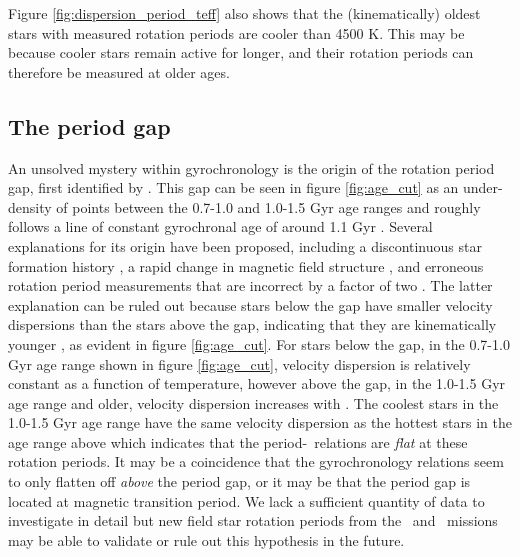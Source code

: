 Figure \ref{fig:dispersion_period_teff} also shows that the (kinematically)
oldest stars with measured rotation periods are cooler than 4500 K.
This may be because cooler stars remain active for longer, and their rotation
periods can therefore be measured at older ages.


\subsection{The period gap}
An unsolved mystery within gyrochronology is the origin of the rotation period
gap, first identified by \citet{mcquillan2013}.
This gap can be seen in figure \ref{fig:age_cut} as an under-density of points
between the 0.7-1.0 and 1.0-1.5 Gyr age ranges and roughly follows a line of
constant gyrochronal age of around 1.1 Gyr \citep[according to
the gyrochronology relation of][]{angus2019}.
Several explanations for its origin have been proposed, including a
discontinuous star formation history \citep{mcquillan2013, davenport2017,
davenport2018}, a rapid change in magnetic field structure
\citep{reinhold2019}, and erroneous rotation period measurements that are
incorrect by a factor of two \citep{koen2018}.
The latter explanation can be ruled out because stars below the gap have
smaller velocity dispersions than the stars above the gap, indicating that
they are kinematically younger \citep{mcquillan2013, davenport2018}, as
evident in figure \ref{fig:age_cut}.
For stars below the gap, in the 0.7-1.0 Gyr age range shown in figure
\ref{fig:age_cut}, velocity dispersion is relatively constant as a function of
temperature, however above the gap, in the 1.0-1.5 Gyr age range and older,
velocity dispersion increases with \teff.
The coolest stars in the 1.0-1.5 Gyr age range have the same velocity
dispersion as the hottest stars in the age range above which indicates that
the period-\teff\ relations are {\it flat} at these rotation periods.
It may be a coincidence that the gyrochronology relations seem to only flatten
off {\it above} the period gap, or it may be that the period gap is located at
magnetic transition period.
We lack a sufficient quantity of data to investigate in detail but new field
star rotation periods from the \ktwo\ and \tess\ missions may be able to
validate or rule out this hypothesis in the future.
